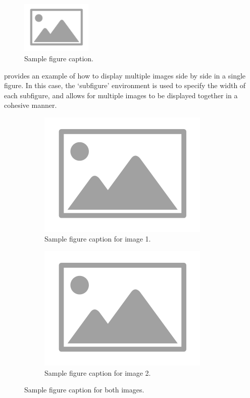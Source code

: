 \documentclass{article}
\begin{document}
\begin{figure}[h]
  \centering
  \includegraphics[width=0.3\textwidth]{images/placeholder-image.png}
  \caption{Sample figure caption.}
  \label{fig:example}
\end{figure}

 provides an example of how to display multiple images side by side in a single figure. In this case, the `subfigure' environment is used to specify the width of each subfigure, and allows for multiple images to be displayed together in a cohesive manner.

\begin{figure}[h]
  \centering
  \begin{subfigure}{0.45\textwidth}
    \includegraphics[width=0.9\linewidth]{images/placeholder-image.png}
    \caption{Sample figure caption for image 1.}
  \end{subfigure}
  \hfill
  \begin{subfigure}{0.45\textwidth}
    \includegraphics[width=0.9\linewidth]{images/placeholder-image.png}
    \caption{Sample figure caption for image 2.}
  \end{subfigure}
  \caption{Sample figure caption for both images.}
  \label{fig:example-2}
\end{figure}
\end{document}
